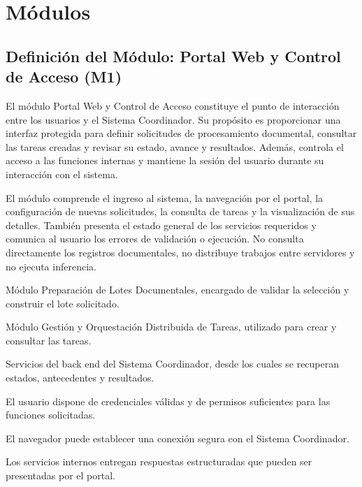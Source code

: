 \section{Módulos}
\label{sec:modulos}


\subsection{Definición del Módulo: Portal Web y Control de Acceso (M1)}
\label{subsec:modulo_m1}

\begin{definicionmodulo}

\item[Propósito] El módulo Portal Web y Control de Acceso constituye el punto de interacción entre los usuarios y el Sistema Coordinador. Su propósito es proporcionar una interfaz protegida para definir solicitudes de procesamiento documental, consultar las tareas creadas y revisar su estado, avance y resultados. Además, controla el acceso a las funciones internas y mantiene la sesión del usuario durante su interacción con el sistema.

\item[Alcance] El módulo comprende el ingreso al sistema, la navegación por el portal, la configuración de nuevas solicitudes, la consulta de tareas y la visualización de sus detalles. También presenta el estado general de los servicios requeridos y comunica al usuario los errores de validación o ejecución. No consulta directamente los registros documentales, no distribuye trabajos entre servidores y no ejecuta inferencia.

\item[Dependencias]
\begin{elementosmodulo}
    \item Módulo Preparación de Lotes Documentales, encargado de validar la selección y construir el lote solicitado.
    \item Módulo Gestión y Orquestación Distribuida de Tareas, utilizado para crear y consultar las tareas.
    \item Servicios del back end del Sistema Coordinador, desde los cuales se recuperan estados, antecedentes y resultados.
\end{elementosmodulo}

\item[Supuestos]
\begin{elementosmodulo}
    \item El usuario dispone de credenciales válidas y de permisos suficientes para las funciones solicitadas.
    \item El navegador puede establecer una conexión segura con el Sistema Coordinador.
    \item Los servicios internos entregan respuestas estructuradas que pueden ser presentadas por el portal.
\end{elementosmodulo}


\end{definicionmodulo}
